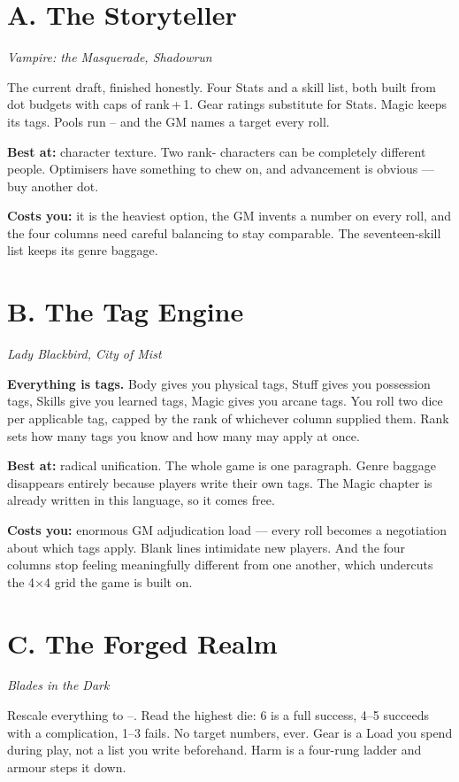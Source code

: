 \documentclass[11pt,oneside]{memoir}
\newcommand{\src}[1]{{\small\itshape\color{atrAccent2}#1}}
\begin{document}
\section{A. The Storyteller}
\src{Vampire: the Masquerade, Shadowrun}

The current draft, finished honestly. Four Stats and a skill list, both
built from dot budgets with caps of rank\,+\,1. Gear ratings substitute
for Stats. Magic keeps its tags. Pools run -- and the GM
names a target every roll.

\textbf{Best at:} character texture. Two rank- characters can be
completely different people. Optimisers have something to chew on, and
advancement is obvious --- buy another dot.

\textbf{Costs you:} it is the heaviest option, the GM invents a number on
every roll, and the four columns need careful balancing to stay
comparable. The seventeen-skill list keeps its genre baggage.

\section{B. The Tag Engine}
\src{Lady Blackbird, City of Mist}

\textbf{Everything is tags.} Body gives you physical tags, Stuff gives you
possession tags, Skills give you learned tags, Magic gives you arcane
tags. You roll two dice per applicable tag, capped by the rank of
whichever column supplied them. Rank sets how many tags you know and how
many may apply at once.

\textbf{Best at:} radical unification. The whole game is one paragraph.
Genre baggage disappears entirely because players write their own tags.
The Magic chapter is already written in this language, so it comes free.

\textbf{Costs you:} enormous GM adjudication load --- every roll becomes a
negotiation about which tags apply. Blank lines intimidate new players.
And the four columns stop feeling meaningfully different from one another,
which undercuts the 4$\times$4 grid the game is built on.

\section{C. The Forged Realm}
\src{Blades in the Dark}

Rescale everything to --. Read the highest die: 6 is a
full success, 4--5 succeeds with a complication, 1--3 fails. No target
numbers, ever. Gear is a Load you spend during play, not a list you write
beforehand. Harm is a four-rung ladder and armour steps it down.
\end{document}
